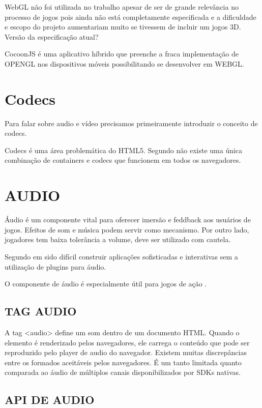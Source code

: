 \documentclass[
12pt,
a4paper,
portuges,
draft
]{report}
\begin{document}
WebGL não foi utilizada no trabalho apesar de ser de grande
relevância no processo de jogos pois ainda não está completamente
especificada e a dificuldade e escopo do projeto aumentariam muito se
tivessem de incluir um jogos 3D. Versão da especificação atual?

CocoonJS é uma aplicativo híbrido que preenche a fraca implementação
de OPENGL nos dispositivos móveis possibilitando se desenvolver em
WEBGL.
\section{Codecs}

Para falar sobre audio e vídeo precisamos primeiramente introduzir o conceito de codecs.

Codecs é uma área problemática do HTML5. Segundo \cite{diveIntohtml} não existe uma única combinação de containers e codecs que funcionem em todos os navegadores.

\section{AUDIO}
Áudio é um componente vital para oferecer imersão e feddback aos
usuários de jogos. Efeitos de som e música podem servir como mecanismo. 
Por outro lado, jogadores tem baixa tolerância a volume, deve ser utilizado com cautela.

Segundo \cite{browserGamesTechnologyAndFuture} em sido difícil construir aplicações sofisticadas e interativas sem a utilização de plugins para áudio.

O componente de áudio é especialmente útil para jogos de ação \autocite{browserGamesTechnologyAndFuture}.

\subsection{TAG AUDIO}

A tag <audio> define um som dentro de um documento HTML. Quando o
elemento é renderizado pelos navegadores, ele carrega o conteúdo
que pode ser reproduzido pelo player de audio do navegador. Existem
muitas discrepâncias entre os formados aceitáveis pelos navegadores.
É um tanto limitada quanto comparada ao áudio de múltiplos canais
disponibilizados por SDKs nativas.

\subsection{API DE AUDIO}
\end{document}
